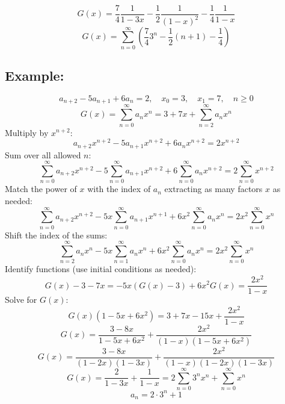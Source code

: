 \documentclass[11pt]{article}
\begin{document}
\[
G(x) = \frac{7}{4} \frac{1}{1 - 3x} - \frac{1}{2} \frac{1}{(1 - x)^2} - \frac{1}{4} \frac{1}{1 - x}
\]
\[
G(x) = \sum_{n = 0}^{\infty} \left( \frac{7}{4} 3^n - \frac{1}{2} (n + 1) - \frac{1}{4} \right) 
\]

\subsection*{Example:}
\[
a_{n+2} - 5a_{n+1} + 6a_n = 2, \quad x_0 = 3, \quad x_1 = 7, \quad n \geq 0
\]
\[
G(x) = \sum_{n = 0}^{\infty} a_n x^n = 3 + 7x + \sum_{n = 2}^{\infty} a_n x^n
\]
Multiply by $x^{n+2}$:
\[
a_{n+2} x^{n+2} - 5a_{n+1} x^{n+2} + 6a_n x^{n+2} = 2x^{n+2}
\]
Sum over all allowed $n$:
\[
\sum_{n = 0}^{\infty} a_{n+2} x^{n+2} - 5 \sum_{n = 0}^{\infty} a_{n+1} x^{n+2} + 6 \sum_{n = 0}^{\infty} a_n x^{n+2} = 2 \sum_{n = 0}^{\infty} x^{n+2}
\]
Match the power of $x$ with the index of $a_n$ extracting as many factors $x$ as needed:
\[
\sum_{n = 0}^{\infty} a_{n+2} x^{n+2} - 5x \sum_{n = 0}^{\infty} a_{n+1} x^{n+1} + 6x^2 \sum_{n = 0}^{\infty} a_n x^n = 2x^2 \sum_{n = 0}^{\infty} x^n
\]
Shift the index of the sums:
\[
\sum_{n = 2}^{\infty} a_n x^n - 5x \sum_{n = 1}^{\infty} a_n x^n + 6x^2 \sum_{n = 0}^{\infty} a_n x^n = 2x^2 \sum_{n = 0}^{\infty} x^n
\]
Identify functions (use initial conditions as needed):
\[
G(x) - 3 - 7x = -5x(G(x) - 3) + 6x^2 G(x) = \frac{2x^2}{1 - x}
\]
Solve for $G(x)$:
\[
G(x) (1 - 5x + 6x^2) = 3 + 7x - 15x + \frac{2x^2}{1 - x} 
\]
\[
G(x) = \frac{3 - 8x}{1 - 5x + 6x^2} + \frac{2x^2}{(1 - x)(1 - 5x + 6x^2)}
\]
\[
G(x) = \frac{3 - 8x}{(1 - 2x)(1 - 3x)} + \frac{2x^2}{(1 - x)(1 - 2x)(1 - 3x)}
\]
\[
G(x) = \frac{2}{1 - 3x} + \frac{1}{1 - x} = 2 \sum_{n = 0}^{\infty} 3^n x^n + \sum_{n = 0}^{\infty} x^n
\]
\[
a_n = 2 \cdot 3^n + 1
\]
\end{document}
